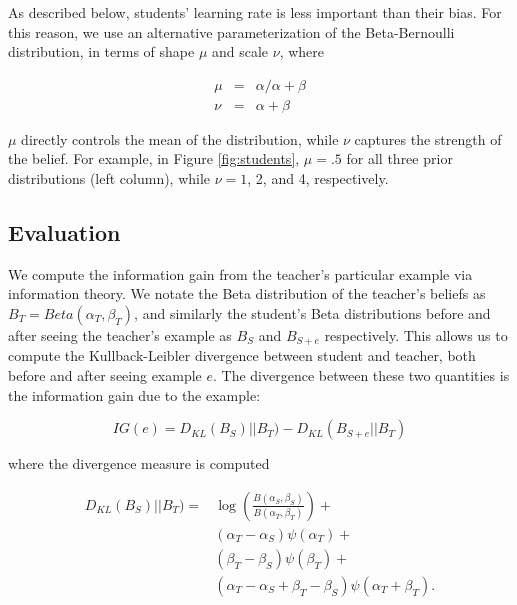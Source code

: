\documentclass[10pt,letterpaper]{article}
\begin{document}
As described below, students' learning rate is less important than their bias. For this reason, we use an alternative parameterization of the Beta-Bernoulli distribution, in terms of shape $\mu$ and scale $\nu$, where

\begin{eqnarray}
\mu &=& \alpha / \alpha + \beta \\
\nu &=& \alpha + \beta
\end{eqnarray}

\noindent $\mu$ directly controls the mean of the distribution, while $\nu$ captures the strength of the belief. For example, in Figure \ref{fig:students}, $\mu=.5$ for all three prior distributions (left column), while $\nu = 1$, 2, and 4, respectively.

\subsection{Evaluation}

We compute the information gain from the teacher's particular example via information theory. We notate the Beta distribution of the teacher's beliefs as $B_T = Beta(\alpha_T,\beta_T)$, and similarly the student's Beta distributions before and after seeing the teacher's example as $B_{S}$ and $B_{S+e}$ respectively. This allows us to compute the Kullback-Leibler divergence \cite{cover2012} between student and teacher, both before and after seeing example $e$. The divergence between these two quantities is the information gain due to the example:

\begin{equation}
\label{eq:ig}
IG(e) = D_{KL} ( B_{S})||B_T )  - D_{KL} ( B_{S+e} ||B_T ) 
\end{equation}

\noindent where the divergence measure is computed

\begin{equation}
\label{eq:dkl}
\begin{split}
D_{KL} ( B_{S})||B_T )  = & \log( \frac{B(\alpha_{S},\beta_{S})}{B(\alpha_{T},\beta_{T})}) + \\
& (\alpha_T - \alpha_S) \psi (\alpha_T) + \\ 
& (\beta_T - \beta_S) \psi (\beta_T) + \\
& (\alpha_T - \alpha_S + \beta_T - \beta_S) \psi (\alpha_T + \beta_T). \\
\end{split}
\end{equation}
\end{document}
